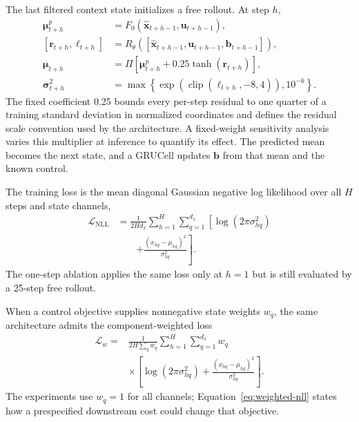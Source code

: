\documentclass[pdflatex,sn-basic]{sn-jnl}
\newcommand{\vect}[1]{\mathbf{#1}}
\begin{document}
The last filtered context state initializes a free rollout. At step $h$,
\begin{align}
 \boldsymbol\mu^{p}_{t+h} &= F_0(\hat{\vect x}_{t+h-1},\vect u_{t+h-1}),\\
 [\vect r_{t+h},\vect \ell_{t+h}] &=
 R_\theta([\hat{\vect x}_{t+h-1},\vect u_{t+h-1},\vect b_{t+h-1}]),\\
 \boldsymbol\mu_{t+h} &= \Pi\!\left[
 \boldsymbol\mu^{p}_{t+h}+0.25\tanh(\vect r_{t+h})\right],\\
 \boldsymbol\sigma^2_{t+h} &=
 \max\!\left\{\exp\!\left(\operatorname{clip}(\vect\ell_{t+h},-8,4)\right),
 10^{-6}\right\}.
 \label{eq:residual-rollout}
\end{align}
The fixed coefficient 0.25 bounds every per-step residual to one quarter of a
training standard deviation in normalized coordinates and defines the residual
scale convention used by the architecture. A fixed-weight sensitivity analysis
varies this multiplier at inference to quantify its effect. The predicted mean becomes
the next state, and a GRUCell updates $\vect b$ from that mean and the known
control.

The training loss is the mean diagonal Gaussian negative log likelihood over
all $H$ steps and state channels,
\begin{equation}
\begin{aligned}
 \mathcal L_{\mathrm{NLL}}
 &=\frac{1}{2Hd_x}\sum_{h=1}^{H}\sum_{q=1}^{d_x}
 \left[\log(2\pi\sigma^2_{hq})\right.\\[-0.2em]
 &\qquad\left.+\frac{(x_{hq}-\mu_{hq})^2}{\sigma^2_{hq}}\right].
\end{aligned}
 \label{eq:nll}
\end{equation}
The one-step ablation applies the same loss only at $h=1$ but is still
evaluated by a 25-step free rollout.

When a control objective supplies nonnegative state weights $w_q$, the same
architecture admits the component-weighted loss
\begin{equation}
 \begin{aligned}
 \mathcal L_w={}&\frac{1}{2H\sum_q w_q}
 \sum_{h=1}^{H}\sum_{q=1}^{d_x}w_q \\
 &\times\left[\log(2\pi\sigma^2_{hq})+
 \frac{(x_{hq}-\mu_{hq})^2}{\sigma^2_{hq}}\right].
 \end{aligned}
 \label{eq:weighted-nll}
\end{equation}
The experiments use $w_q=1$ for all channels; Equation~\eqref{eq:weighted-nll}
states how a prespecified downstream cost could change that objective.
\end{document}
